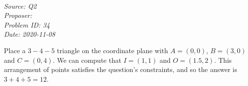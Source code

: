 \SSbreak\\
\emph{Source:  Q2}\\
\emph{Proposer: \Pss}\\
\emph{Problem ID: 34}\\
\emph{Date: 2020-11-08}\\
\SSbreak

\bigskip 

\begin{solution}\hfil\medskip

    Place a $3-4-5$ triangle on the coordinate plane with $A = (0, 0)$, $B = (3, 0)$ and $C = (0, 4)$. 
    We can compute that $I = (1, 1)$ and $O = (1.5, 2)$. 
    This arrangement of points satisfies the question's constraints, and so the answer is $3 + 4 + 5 = \boxed{12}$. 
\end{solution}\bigskip